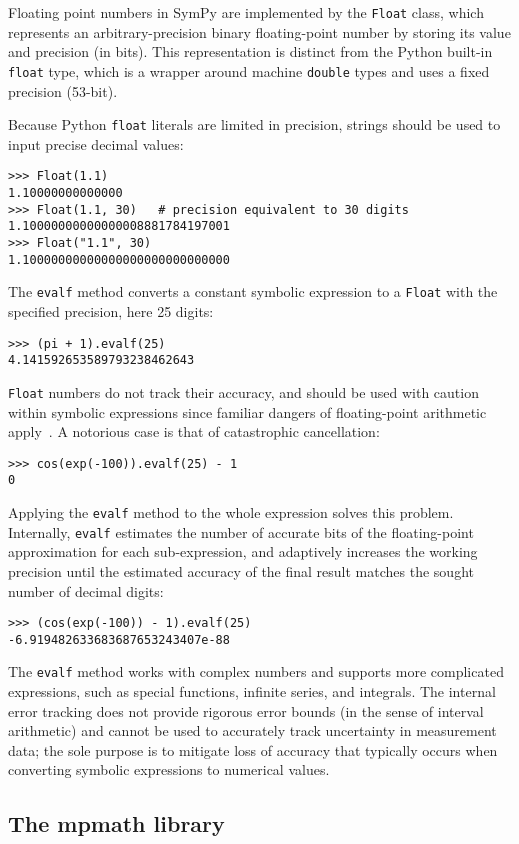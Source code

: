 Floating point numbers in SymPy are implemented by the \texttt{Float} class,
which represents an arbitrary-precision binary floating-point number by
storing its value and precision (in bits). This representation is distinct
from the Python built-in \texttt{float} type, which is a wrapper around
machine \texttt{double} types and uses a fixed precision (53-bit).

Because Python \texttt{float} literals are limited in precision, strings
should be used to input precise decimal values:
\begin{verbatim}
>>> Float(1.1)
1.10000000000000
>>> Float(1.1, 30)   # precision equivalent to 30 digits
1.10000000000000008881784197001
>>> Float("1.1", 30)
1.10000000000000000000000000000
\end{verbatim}
The \texttt{evalf} method converts a constant symbolic expression to a
\texttt{Float} with the specified precision, here 25 digits:
\begin{verbatim}
>>> (pi + 1).evalf(25)
4.141592653589793238462643
\end{verbatim}
\texttt{Float} numbers do not track their accuracy,
and should be used with caution within symbolic expressions
since familiar dangers of floating-point arithmetic apply~\cite{goldberg1991every}.
A notorious case is that of catastrophic cancellation:
\begin{verbatim}
>>> cos(exp(-100)).evalf(25) - 1
0
\end{verbatim}
Applying the \texttt{evalf} method to the whole expression solves
this problem. Internally, \texttt{evalf} estimates the number of accurate
bits of the floating-point
approximation for each sub-expression, and adaptively increases the
working precision until the estimated accuracy of the
final result matches the sought number of decimal digits:
\begin{verbatim}
>>> (cos(exp(-100)) - 1).evalf(25)
-6.919482633683687653243407e-88
\end{verbatim}
The \texttt{evalf} method works with complex numbers and supports
more complicated expressions, such as
special functions, infinite series, and integrals.
The internal error tracking does not provide rigorous error bounds
(in the sense of interval arithmetic) and cannot be used to accurately track
uncertainty in measurement data;
the sole purpose is to mitigate loss of accuracy that typically occurs
when converting symbolic expressions to numerical values.

\subsection{The mpmath library}
\label{sec:mpmath}

